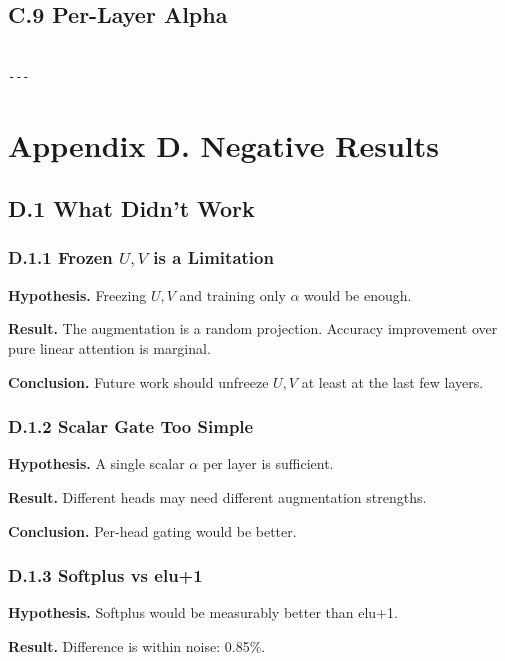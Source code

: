 \subsection{C.9 Per-Layer Alpha}

\begin{lstlisting}

---
\end{lstlisting}


\section{Appendix D. Negative Results}

\subsection{D.1 What Didn't Work}

\subsubsection{D.1.1 Frozen $U, V$ is a Limitation}

\textbf{Hypothesis.} Freezing $U, V$ and training only $\alpha$ would be enough.

\textbf{Result.} The augmentation is a random projection. Accuracy improvement 
over pure linear attention is marginal.

\textbf{Conclusion.} Future work should unfreeze $U, V$ at least at the 
last few layers.

\subsubsection{D.1.2 Scalar Gate Too Simple}

\textbf{Hypothesis.} A single scalar $\alpha$ per layer is sufficient.

\textbf{Result.} Different heads may need different augmentation strengths.

\textbf{Conclusion.} Per-head gating would be better.

\subsubsection{D.1.3 Softplus vs elu+1}

\textbf{Hypothesis.} Softplus would be measurably better than elu+1.

\textbf{Result.} Difference is within noise: 0.85\%.

